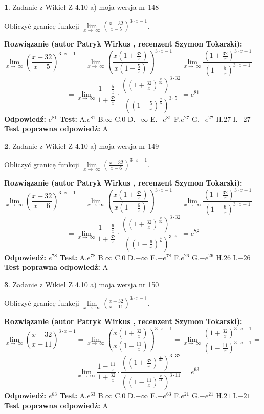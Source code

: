 \documentclass[12pt, a4paper]{article}
\theoremstyle{definition} %
\newtheorem{zad}{}
\newcommand{\zadStart}[1]{\begin{zad}#1\newline}
\newcommand{\zadStop}{\end{zad}}
\newcommand{\rozwStart}[2]{\noindent \textbf{Rozwiązanie (autor #1 , recenzent #2): }\newline}
\newcommand{\rozwStop}{\newline}
\newcommand{\odpStart}{\noindent \textbf{Odpowiedź:}\newline}
\newcommand{\odpStop}{\newline}
\newcommand{\testStart}{\noindent \textbf{Test:}\newline}
\newcommand{\testStop}{\newline}
\newcommand{\kluczStart}{\noindent \textbf{Test poprawna odpowiedź:}\newline}
\newcommand{\kluczStop}{\newline}
\begin{document}
\zadStart{Zadanie z Wikieł Z 4.10 a) moja wersja nr 148}

Obliczyć granicę funkcji  $\lim\limits_{x\to\ \infty}(\frac{x+32}{x-5})^{3\cdot x-1}$.
\zadStop
\rozwStart{Patryk Wirkus}{Szymon Tokarski}
$$\lim\limits_{x\to\ \infty}(\frac{x+32}{x-5})^{3\cdot x-1} = \lim\limits_{x\to\ \infty}(\frac{x(1+\frac{32}{x})}{x(1-\frac{5}{x})})^{3\cdot x-1}=\lim\limits_{x\to\ \infty}\frac{(1+\frac{32}{x})^{3\cdot x-1}}{(1-\frac{5}{x})^{3\cdot x-1}}=$$
$$=\lim\limits_{x\to\ \infty}\frac{1-\frac{5}{x}}{1+\frac{32}{x}}\cdot\frac{((1+\frac{32}{x})^{\frac{x}{32}})^{3\cdot32}}{((1-\frac{5}{x})^{\frac{x}{5}})^{3\cdot5}}=e^{81}$$
\rozwStop
\odpStart
$e^{81}$
\odpStop
\testStart
A.$e^{81}$ B.$\infty$ C.$0$ D.$-\infty$ E.$-e^{81}$
F.$e^{27}$ G.$-e^{27}$
H.$27$
I.$-27$
\testStop
\kluczStart
A
\kluczStop



\zadStart{Zadanie z Wikieł Z 4.10 a) moja wersja nr 149}

Obliczyć granicę funkcji  $\lim\limits_{x\to\ \infty}(\frac{x+32}{x-6})^{3\cdot x-1}$.
\zadStop
\rozwStart{Patryk Wirkus}{Szymon Tokarski}
$$\lim\limits_{x\to\ \infty}(\frac{x+32}{x-6})^{3\cdot x-1} = \lim\limits_{x\to\ \infty}(\frac{x(1+\frac{32}{x})}{x(1-\frac{6}{x})})^{3\cdot x-1}=\lim\limits_{x\to\ \infty}\frac{(1+\frac{32}{x})^{3\cdot x-1}}{(1-\frac{6}{x})^{3\cdot x-1}}=$$
$$=\lim\limits_{x\to\ \infty}\frac{1-\frac{6}{x}}{1+\frac{32}{x}}\cdot\frac{((1+\frac{32}{x})^{\frac{x}{32}})^{3\cdot32}}{((1-\frac{6}{x})^{\frac{x}{6}})^{3\cdot6}}=e^{78}$$
\rozwStop
\odpStart
$e^{78}$
\odpStop
\testStart
A.$e^{78}$ B.$\infty$ C.$0$ D.$-\infty$ E.$-e^{78}$
F.$e^{26}$ G.$-e^{26}$
H.$26$
I.$-26$
\testStop
\kluczStart
A
\kluczStop



\zadStart{Zadanie z Wikieł Z 4.10 a) moja wersja nr 150}

Obliczyć granicę funkcji  $\lim\limits_{x\to\ \infty}(\frac{x+32}{x-11})^{3\cdot x-1}$.
\zadStop
\rozwStart{Patryk Wirkus}{Szymon Tokarski}
$$\lim\limits_{x\to\ \infty}(\frac{x+32}{x-11})^{3\cdot x-1} = \lim\limits_{x\to\ \infty}(\frac{x(1+\frac{32}{x})}{x(1-\frac{11}{x})})^{3\cdot x-1}=\lim\limits_{x\to\ \infty}\frac{(1+\frac{32}{x})^{3\cdot x-1}}{(1-\frac{11}{x})^{3\cdot x-1}}=$$
$$=\lim\limits_{x\to\ \infty}\frac{1-\frac{11}{x}}{1+\frac{32}{x}}\cdot\frac{((1+\frac{32}{x})^{\frac{x}{32}})^{3\cdot32}}{((1-\frac{11}{x})^{\frac{x}{11}})^{3\cdot11}}=e^{63}$$
\rozwStop
\odpStart
$e^{63}$
\odpStop
\testStart
A.$e^{63}$ B.$\infty$ C.$0$ D.$-\infty$ E.$-e^{63}$
F.$e^{21}$ G.$-e^{21}$
H.$21$
I.$-21$
\testStop
\kluczStart
A
\kluczStop
\end{document}
